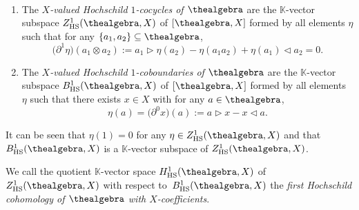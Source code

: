\documentclass[10pt,a4paper]{amsart}
\numberwithin{equation}{section}
\newcommand{\HScocycles}[3]{Z^{#1}_{\mathrm{HS}}(#2,#3)}
\newcommand{\HScoboundaries}[3]{B^{#1}_{\mathrm{HS}}(#2,#3)}
\newcommand{\HScohomology}[3]{H^{#1}_{\mathrm{HS}}(#2,#3)}
\newcommand{\Smonoidalproduct}{\otimes}
\newcommand{\SinternalhomX}[2]{[#1,#2]}
\newcommand{\Sleftmoduleaction}{\triangleright}
\newcommand{\Srightmoduleaction}{\triangleleft}
\newcommand{\thefield}{\mathbb{K}}
\newcommand{\themodule}{X}
\begin{document}
{\begin{Definition}
  \label{definition:hochschild-one-cocycles-and-coboundaries} \
  \begin{enumerate}\itemsep=0pt
  \item
    \label{definition:hochschild-one-cocycles-and-coboundaries-1}
    {
      \newcommand{\someonecocycle}{\eta}
      \newcommand{\firstelement}{a_1}
      \newcommand{\secondelement}{a_2}
      The \emph{$\themodule$-valued Hochschild $1$-cocycles of $\thealgebra$} are the $\thefield$-vector subspace $\HScocycles{1}{\thealgebra}{\themodule}$ of $\SinternalhomX{\thealgebra}{\themodule}$ formed by  all elements $\someonecocycle$ such that    for any $\{\firstelement,\secondelement\}\subseteq \thealgebra$,
    \[
      \bigl(\partial^1\someonecocycle\bigr)(\firstelement\Smonoidalproduct\secondelement):= \firstelement\Sleftmoduleaction\someonecocycle(\secondelement)-\someonecocycle(\firstelement\secondelement)+\someonecocycle(\firstelement)\Srightmoduleaction\secondelement=0.
    \]
  }
\item
  \label{definition:hochschild-one-cocycles-and-coboundaries-2}
  {
    \newcommand{\someonecocycle}{\eta}
    \newcommand{\somevector}{x}
     \newcommand{\someelement}{a}
     The \emph{$\themodule$-valued Hochschild $1$-coboundaries of $\thealgebra$} are the $\thefield$-vector subspace $\HScoboundaries{1}{\thealgebra}{\themodule}$ of $\SinternalhomX{\thealgebra}{\themodule}$ formed by  all elements $\someonecocycle$ such that there exists $\somevector\in\themodule$ with     for any $\someelement\in\thealgebra$,
     \[
       \someonecocycle(\someelement)=\bigl(\partial^0 \somevector\bigr)(\someelement):= \someelement\Sleftmoduleaction\somevector -\somevector\Srightmoduleaction\someelement.
     \]
   }
  \end{enumerate}
\end{Definition}
{
  \newcommand{\somecocycle}{\eta}
It can be seen that $\somecocycle(1)=0$ for any $\somecocycle\in\HScocycles{1}{\thealgebra}{\themodule}$ and that $\HScoboundaries{1}{\thealgebra}{\themodule}$ is a $\thefield$-vector sub\-space of $\HScocycles{1}{\thealgebra}{\themodule}$.
}

\begin{Definition}
  \label{definition:hochschild-one-cohomology}
We call the quotient $\thefield$-vector space $\HScohomology{1}{\thealgebra}{\themodule}$ of   $\HScocycles{1}{\thealgebra}{\themodule}$ with respect to~$\HScoboundaries{1}{\thealgebra}{\themodule}$ the \emph{first Hochschild cohomology of  $\thealgebra$ with  $\themodule$-coefficients}.
\end{Definition}

}
\end{document}
